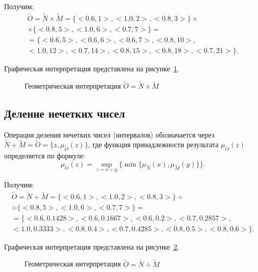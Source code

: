 Получим: 
\begin{multline*}
	\tilde{O} = \tilde{N} \times \tilde{M} = \{ <0.6, 1>, <1.0, 2>, <0.8, 3> \} \times \\
	\times \{ <0.8, 5>, <1.0, 6>, <0.7, 7> \} = \\ 
	= \{ < 0.6, 5 >, < 0.6, 6 >, < 0.6, 7 >, < 0.8, 10 >, \\ < 1.0, 12 >, < 0.7, 14 >, < 0.8, 15 >, < 0.8, 18 >, < 0.7, 21 > \}.
\end{multline*}

Графическая интерпретация представлена на рисунке~\ref{fig:n_by_m}.

\begin{figure}[H]
    \centering
    \caption{Геометрическая интерпретация $\tilde{O}=\tilde{N} \times \tilde{M}$}
    \label{fig:n_by_m}
\end{figure}

\subsection{Деление нечетких чисел}
Операция деления нечетких чисел (интервалов) обозначается через $\tilde{N} \div \tilde{M} = \tilde{O} = \{ z, \mu_{\tilde{O}} (z) \}$, где функция принадлежности результата $\mu_{\tilde{O}} (z)$ определяется по формуле:
\[
	\mu_{\tilde{O}} (z) = \sup_{z=x \div y} \{ \min \{ \mu_{\tilde{N}} (x), \mu_{\tilde{M}} (y) \} \}.
\]

Получим: 
\begin{multline*}
	\tilde{O} = \tilde{N} \div \tilde{M} = \{ <0.6, 1>, <1.0, 2>, <0.8, 3> \} \div \\
	\div \{ <0.8, 5>, <1.0, 6>, <0.7, 7> \} = \\ 
	= \{ < 0.6, 0.1428 >, < 0.6, 0.1667 >, < 0.6, 0.2 >, < 0.7, 0.2857 >, \\ < 1.0, 0.3333 >, < 0.8, 0.4 >, < 0.7, 0.4285 >, < 0.8, 0.5 >, < 0.8, 0.6 > \}.
\end{multline*}

Графическая интерпретация представлена на рисунке~\ref{fig:n_div_m}.

\begin{figure}[H]
    \centering
    \caption{Геометрическая интерпретация $\tilde{O}=\tilde{N} \div \tilde{M}$}
    \label{fig:n_div_m}
\end{figure}

